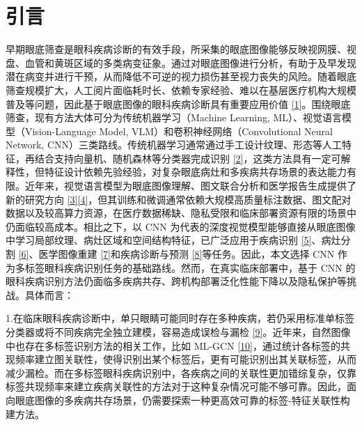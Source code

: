 \section{引言}\label{ux5f15ux8a00}

早期眼底筛查是眼科疾病诊断的有效手段，所采集的眼底图像能够反映视网膜、视盘、血管和黄斑区域的多类病变征象。通过对眼底图像进行分析，有助于及早发现潜在病变并进行干预，从而降低不可逆的视力损伤甚至视力丧失的风险。随着眼底筛查规模扩大，人工阅片面临耗时长、依赖专家经验、难以在基层医疗机构大规模普及等问题，因此基于眼底图像的眼科疾病诊断具有重要应用价值 \hyperref[_Ref213949315]{{[}1{]}}。围绕眼底筛查，现有方法大体可分为传统机器学习（Machine Learning, ML）、视觉语言模型（Vision-Language Model, VLM）和卷积神经网络（Convolutional Neural Network, CNN）三类路线。传统机器学习通常通过手工设计纹理、形态等人工特征，再结合支持向量机、随机森林等分类器完成识别 \hyperref[_RefRahman2022MLFundus]{{[}2{]}}，这类方法具有一定可解释性，但特征设计依赖先验经验，对复杂眼底病灶和多疾病共存场景的表达能力有限。近年来，视觉语言模型为眼底图像理解、图文联合分析和医学报告生成提供了新的研究方向 \hyperref[_RefLim2024VLVOphthalmology]{{[}3{]}}\hyperref[_RefUrooj2025LLMMedicalImage]{{[}4{]}}，但其训练和微调通常依赖大规模高质量标注数据、图文配对数据以及较高算力资源，在医疗数据稀缺、隐私受限和临床部署资源有限的场景中仍面临较高成本。相比之下，以 CNN 为代表的深度视觉模型能够直接从眼底图像中学习局部纹理、病灶区域和空间结构特征，已广泛应用于疾病识别 \hyperref[_Ref213871637]{{[}5{]}}、病灶分割 \hyperref[_Ref213948625]{{[}6{]}}、医学图像重建 \hyperref[_Ref213948898]{{[}7{]}}和疾病诊断与预测 \hyperref[_Ref213949262]{{[}8{]}}等任务。因此，本文选择 CNN 作为多标签眼科疾病识别任务的基础路线。然而，在真实临床部署中，基于 CNN 的眼科疾病识别方法仍面临多疾病共存、跨机构部署泛化性能下降以及隐私保护等挑战。具体而言：

1.在临床眼科疾病诊断中，单只眼睛可能同时存在多种疾病，若仍采用标准单标签分类器或将不同疾病完全独立建模，容易造成误检与漏检 \hyperref[_Ref213949362]{{[}9{]}}。近年来，自然图像中也存在多标签识别方法的相关工作，比如 ML-GCN \hyperref[_Ref213949382]{{[}10{]}}，通过统计各标签的共现频率建立图关联性，使得识别出某个标签后，更有可能识别出其关联标签，从而减少漏检。而在多标签眼科疾病识别中，各疾病之间的关联性更加错综复杂，仅靠标签共现频率来建立疾病关联性的方法对于这种复杂情况可能不够可靠。因此，面向眼底图像的多疾病共存场景，仍需要探索一种更高效可靠的标签-特征关联性构建方法。

